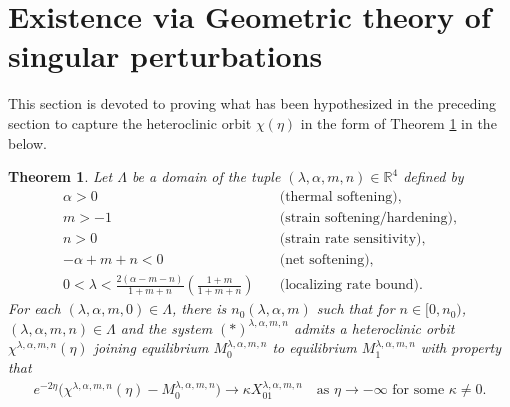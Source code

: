 \documentclass[a4paper,11pt]{article}
\newtheorem{theorem}{Theorem}
\theoremstyle{remark}
\begin{document}
%

\section{Existence via Geometric theory of singular perturbations} \label{sec:proof}
This section is devoted to proving what has been hypothesized in the preceding section to capture the heteroclinic orbit $\chi(\eta)$ in the form of Theorem \ref{thm1} in the below. 
\begin{theorem} \label{thm1}
Let $\Lambda$ be a domain of the tuple $(\lambda,\alpha,m,n)\in\mathbb{R}^4$ defined by %
 \begin{align*}
  \alpha>0\quad&\text{(thermal softening)},\\
  m>-1 \quad&\text{(strain softening/hardening)}, \\%
  n>0 \quad&\text{(strain rate sensitivity)},\\ %
  -\alpha+m+n<0 \quad&\text{(net softening)}, \\%
  0< \lambda < \frac{2(\alpha-m-n)}{1+m+n}\left(\frac{1+m}{1+m+n}\right) \quad&\text{(localizing rate bound)}. %
\end{align*}
 For each $(\lambda,\alpha,m,0) \in \Lambda$, there is $n_0( \lambda,\alpha,m)$ such that for $n \in [0, n_0)$, $(\lambda,\alpha,m,n) \in \Lambda$ and the system $(*)^{\lambda,\alpha,m,n}$ admits a heteroclinic orbit $\chi^{\lambda,\alpha,m,n}(\eta)$ joining equilibrium $M_0^{\lambda,\alpha,m,n}$ to equilibrium $M_1^{\lambda,\alpha,m,n}$ with property that
    \begin{align} \label{eq:rapid}
        e^{-2\eta}\big(\chi^{\lambda,\alpha,m,n}(\eta) - M_0^{\lambda,\alpha,m,n}\big) \rightarrow \kappa X_{01}^{\lambda,\alpha,m,n} \quad \text{as $\eta \rightarrow -\infty$ for some $\kappa\ne0$}.
    \end{align}
\end{theorem}
\end{document}
